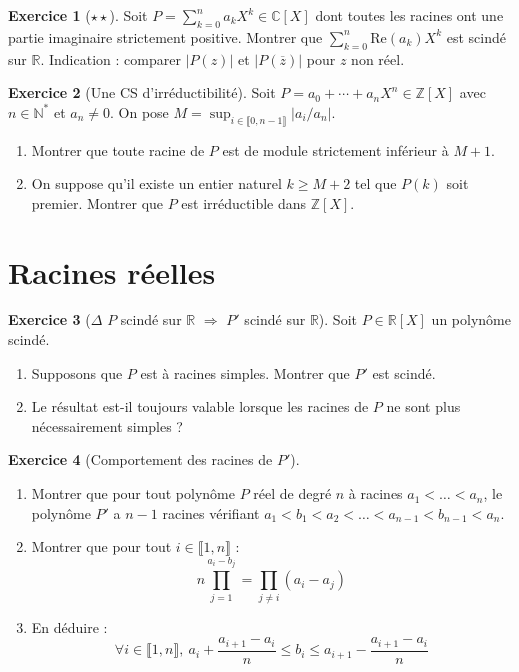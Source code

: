 \documentclass[french]{book}
\newcommand{\N}{\mathbb{N}}
\newcommand{\Z}{\mathbb{Z}}
\newcommand{\R}{\mathbb{R}}
\newcommand{\C}{\mathbb{C}}
\newcommand{\st}{^*}
\theoremstyle{definition}
\newtheorem{ex}{Exercice}[chapter]
\theoremstyle{theorem}
\theoremstyle{remark}
\begin{document}
\begin{ex}[$\star\star$]
	Soit $P=\displaystyle\sum_{k=0}^{n}a_kX^k\in\C[X]$ dont toutes les racines ont une partie imaginaire strictement positive. Montrer que $\displaystyle\sum_{k=0}^{n}\text{Re}(a_k)X^k$ est scindé sur $\R$. Indication : comparer $\lvert P(z)\rvert$ et $\lvert P(\overline{z})\rvert$ pour $z$ non réel.
\end{ex}

\begin{ex}[Une CS d'irréductibilité]
	Soit $P=a_0+\cdots+a_nX^n\in\Z[X]$ avec $n\in\N\st$ et $a_n\ne 0$. On pose $M=\displaystyle\sup_{i\in\llbracket0,n-1\rrbracket}\lvert a_i/a_{n}\rvert$.
	\begin{enumerate}
		\item Montrer que toute racine de $P$ est de module strictement inférieur à $M+1$.
		\item On suppose qu'il existe un entier naturel $k\geqslant M+2$ tel que $P(k)$ soit premier. Montrer que $P$ est irréductible dans $\Z[X]$.
	\end{enumerate}
\end{ex}

\section{Racines réelles}

\begin{ex}[$\Delta$ $P$ scindé sur $\R$ $\Longrightarrow$ $P'$ scindé sur $\R$]
	Soit $P \in \R[X]$ un polynôme scindé.
	\begin{enumerate}
		\item Supposons que $P$ est à racines simples. Montrer que $P'$ est scindé.
		\item Le résultat est-il toujours valable lorsque les racines de $P$ ne sont plus nécessairement simples ?
	\end{enumerate}
\end{ex}

\begin{ex}[Comportement des racines de $P'$]
	\begin{enumerate}
		\item Montrer que pour tout polynôme $P$ réel de degré $n$ à racines $a_1<\ldots<a_n$, le polynôme $P'$ a $n-1$ racines vérifiant $a_1<b_1<a_2<\ldots<a_{n-1}<b_{n-1}<a_n$.
		\item Montrer que pour tout $i\in\llbracket1,n\rrbracket$ : $$n\prod_{j=1}^{a_i-b_j}=\prod_{j\ne i}(a_i-a_j)$$
		\item En déduire : $$\forall i\in\llbracket1,n\rrbracket,\ a_i+\frac{a_{i+1}-a_i}{n}\leqslant b_i\leqslant a_{i+1}-\frac{a_{i+1}-a_i}{n}$$
	\end{enumerate}
\end{ex}
\end{document}
